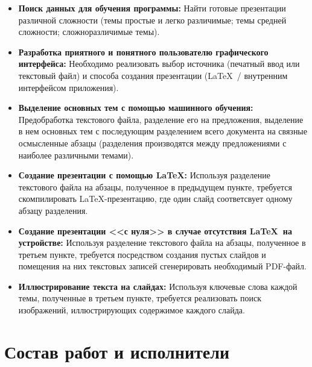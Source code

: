   \begin{itemize}
    \item \textbf{Поиск данных для обучения программы:}
    Найти готовые презентации различной сложности (темы простые и легко различимые;
    темы средней сложности; сложноразличимые темы).
    \item \textbf{Разработка приятного и понятного пользователю графического интерфейса:}
    Необходимо реализовать выбор источника (печатный ввод или текстовый файл) и
    способа создания презентации (\LaTeX~/ внутренним интерфейсом приложения).
    \item \textbf{Выделение основных тем с помощью машинного обучения:}
    Предобработка текстового файла, разделение его на предложения, выделение в нем основных тем
    с последующим разделением всего документа на связные осмысленные абзацы (разделения производятся
    между предложениями с наиболее различными темами).
    \item \textbf{Создание презентации с помощью \LaTeX:}
    Используя разделение текстового файла на абзацы, полученное в предыдущем пункте,
    требуется скомпилировать \LaTeX-презентацию, где один слайд соответсвует одному абзацу разделения.
    \item \textbf{Создание презентации <<с нуля>> в случае отсутствия \LaTeX~на устройстве:}
    Используя разделение текстового файла на абзацы, полученное в третьем пункте,
    требуется посредством создания пустых слайдов и помещения на них текстовых записей
    сгенерировать необходимый PDF-файл. 
    \item \textbf{Иллюстрирование текста на слайдах:}
    Используя ключевые слова каждой темы, полученные в третьем пункте, требуется реализовать
    поиск изображений, иллюстрирующих содержимое каждого слайда.
  \end{itemize}

  \newpage
  \section{Состав работ и исполнители}

